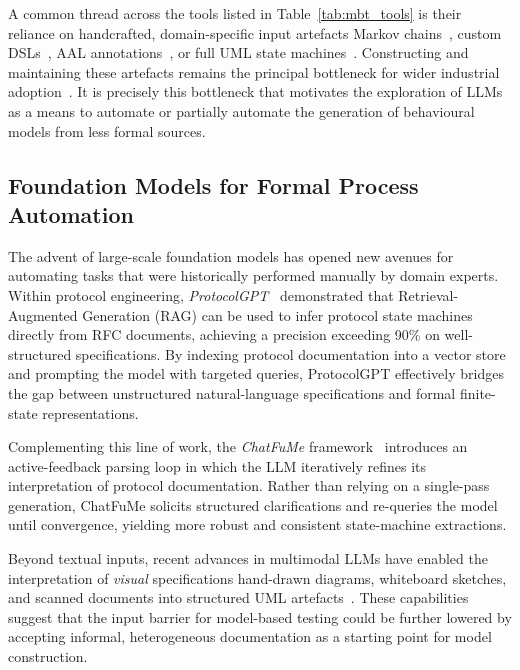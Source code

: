 A common thread across the tools listed in Table~\ref{tab:mbt_tools} is
their reliance on handcrafted, domain-specific input artefacts Markov
chains~\cite{prowell_markov}, custom DSLs~\cite{whittaker1993markov,whittaker1994markov},
AAL annotations~\cite{boehr_constraints}, or full UML state
machines~\cite{pretschner2005mbt}. Constructing and maintaining these
artefacts remains the principal bottleneck for wider industrial
adoption~\cite{taxonomy_mbt}. It is precisely this bottleneck that
motivates the exploration of LLMs as a means to automate or partially
automate the generation of behavioural models from less formal sources.

\subsection{Foundation Models for Formal Process Automation}
\label{sec:rw_foundation_models}

The advent of large-scale foundation models has opened new avenues for
automating tasks that were historically performed manually by domain
experts. Within protocol engineering, \emph{ProtocolGPT}~\cite{protocol_gpt}
demonstrated that Retrieval-Augmented Generation (RAG) can be used to
infer protocol state machines directly from RFC documents, achieving a
precision exceeding 90\% on well-structured specifications. By indexing
protocol documentation into a vector store and prompting the model with
targeted queries, ProtocolGPT effectively bridges the gap between
unstructured natural-language specifications and formal finite-state
representations.

Complementing this line of work, the \emph{ChatFuMe}
framework~\cite{chatfume} introduces an active-feedback parsing loop in
which the LLM iteratively refines its interpretation of protocol
documentation. Rather than relying on a single-pass generation,
ChatFuMe solicits structured clarifications and re-queries the model
until convergence, yielding more robust and consistent state-machine
extractions.

Beyond textual inputs, recent advances in multimodal LLMs have enabled
the interpretation of \emph{visual} specifications hand-drawn
diagrams, whiteboard sketches, and scanned documents into structured
UML artefacts~\cite{uml_benchmarking}. These capabilities suggest that
the input barrier for model-based testing could be further lowered by
accepting informal, heterogeneous documentation as a starting point for
model construction.

